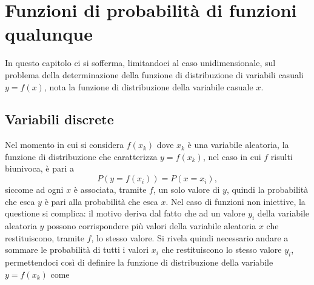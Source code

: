 \documentclass{report}
\begin{document}
\chapter{Funzioni di probabilità di funzioni qualunque}

In questo capitolo ci si sofferma, limitandoci al caso unidimensionale, sul problema della determinazione della funzione di distribuzione di variabili casuali $y = f(x)$, nota la funzione di distribuzione della variabile casuale $x$.
\section{Variabili discrete}
Nel momento in cui si considera $f(x_k)$ dove $x_k$ è una variabile aleatoria, la funzione di distribuzione che caratterizza $y = f(x_k)$, nel caso in cui $f$ risulti biunivoca, è pari a
\begin{equation}
	P(y=f(x_i))=P(x = x_i),
\end{equation}
siccome ad ogni $x$ è associata, tramite $f$, un solo valore di $y$, quindi la probabilità che esca $y$ è pari alla probabilità che esca $x$. Nel caso di funzioni non iniettive, la questione si complica: il motivo deriva dal fatto che ad un valore $y_i$ della variabile aleatoria $y$ possono corrispondere più valori della variabile aleatoria $x$ che restituiscono, tramite $f$, lo stesso valore. Si rivela quindi necessario andare a sommare le probabilità di tutti i valori $x_i$ che restituiscono lo stesso valore $y_i$, permettendoci così di definire la funzione di distribuzione della variabile $y = f(x_k)$ come
\end{document}
